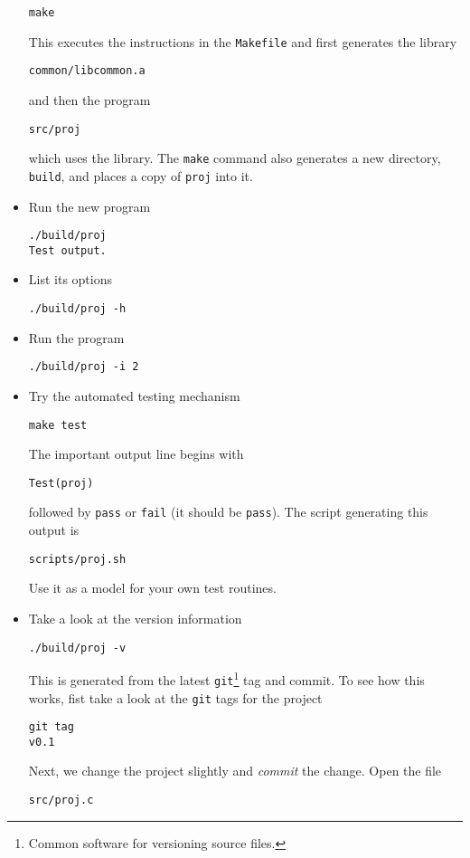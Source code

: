 \documentclass[a4paper, english]{article}
\begin{document}
\begin{itemize}
\begin{verbatim}
make
\end{verbatim}
This executes the instructions in the \texttt{Makefile} and first generates
the library
\begin{verbatim}
common/libcommon.a
\end{verbatim}
and then the program
\begin{verbatim}
src/proj
\end{verbatim}
which uses the library. The \texttt{make} command also generates a new
directory, \texttt{build}, and places a copy of \texttt{proj} into it.
\item Run the new program
\begin{verbatim}
./build/proj 
Test output.
\end{verbatim}
\item List its options
\begin{verbatim}
./build/proj -h
\end{verbatim}
\item Run the program
\begin{verbatim}
./build/proj -i 2
\end{verbatim}
\item Try the automated testing mechanism
\begin{verbatim}
make test
\end{verbatim}
The important output line begins with
\begin{verbatim}
Test(proj)
\end{verbatim}
followed by \texttt{pass} or \texttt{fail} (it should be
\texttt{pass}). The script generating this output is
\begin{verbatim}
scripts/proj.sh
\end{verbatim}
Use it as a model for your own test routines.
\item Take a look at the version information
\begin{verbatim}
./build/proj -v
\end{verbatim}
This is generated from the latest \texttt{git}\footnote{Common
  software for versioning source files.} tag and commit. To see
how this works, fist take a look at the \texttt{git} tags for the
project
\begin{verbatim}
git tag
v0.1
\end{verbatim}
Next, we change the project slightly and \textit{commit} the change. 
Open the file
\begin{verbatim}
src/proj.c
\end{verbatim}

\end{itemize}
\end{document}
